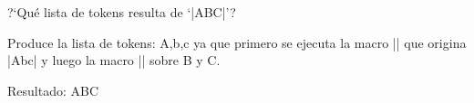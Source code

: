 

\bigskip

\enunciadoS ?`Qu\'e lista de tokens resulta de 
`|\uppercase{a\lowercase{bC}}|'?

\bigskip

\respuestaS Produce la lista de tokens: A,b,c ya que primero se
ejecuta la macro |\uppercase| que origina |A\lowercase{BC}| y luego la
macro |\lowercase| sobre B y C.

\medskip

Resultado: \uppercase{a\lowercase{bC}}
\bye

